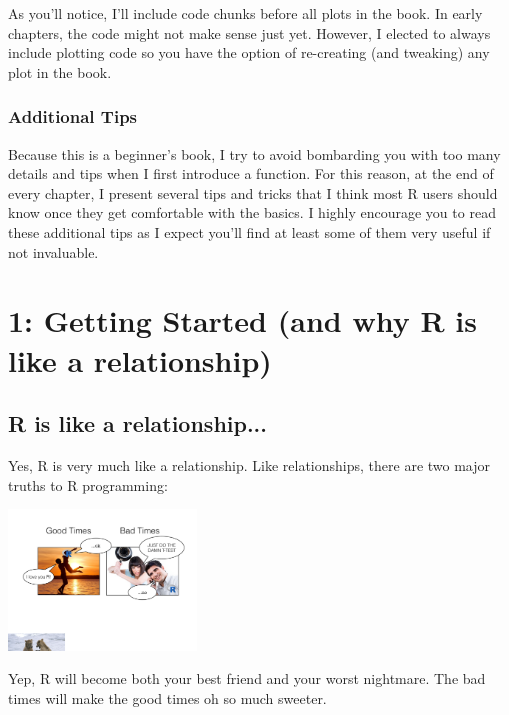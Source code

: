 \documentclass{tufte-book}\usepackage[]{graphicx}\usepackage[]{color}
\begin{document}
As you'll notice, I'll include code chunks before all plots in the book. In early chapters, the code might not make sense just yet. However, I elected to always include plotting code so you have the option of re-creating (and tweaking) any plot in the book.

\subsection{Additional Tips}

Because this is a beginner's book, I try to avoid bombarding you with too many details and tips when I first introduce a function. For this reason, at the end of every chapter, I present several tips and tricks that I think most R users should know once they get comfortable with the basics. I highly encourage you to read these additional tips as I expect you'll find at least some of them very useful if not invaluable.


\mainmatter


\chapter{1: Getting Started (and why R is like a relationship)}
\label{ch:1}


\section{R is like a relationship...}

Yes, R is very much like a relationship. Like relationships, there are two major truths to R programming:


\begin{marginfigure}
\includegraphics[width=5cm,keepaspectration]{rrelationship.pdf}
\caption{Yep, R will become both your best friend and your worst nightmare. The bad times will make the good times oh so much sweeter.}
\end{marginfigure}
\end{document}
